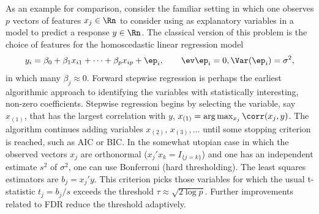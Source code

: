 \documentclass[12pt]{article}
\begin{document}
 As an example for comparison, consider the familiar setting in which one
 observes $p$ vectors of features $x_j \in \Rn$ to consider using as explanatory
 variables in a model to predict a response $y \in \Rn$.  The classical version
 of this problem is the choice of features for the homoscedastic linear
 regression model
 \begin{equation}
   y_i = \beta_0 + \beta_1 x_{i1} + \cdots + \beta_p x_{ip} + \ep_i, 
     \qquad \ev \ep_i = 0, \Var(\ep_i)=\sigma^2,
 \label{eq:homo}
 \end{equation}
 in which many $\beta_j \approx 0$.  Forward stepwise regression is perhaps the
 earliest algorithmic approach to identifying the variables with statistically
 interesting, non-zero coefficients.  Stepwise regression begins by selecting
 the variable, say $x_{(1)}$, that has the largest correlation with $y$,
 $x_{(1)} = \arg \max_{x_j} \corr(x_j,y)$.  The algorithm continues adding
 variables $x_{(2)},\, x_{(3)}, \ldots$ until some stopping criterion is
 reached, such as AIC or BIC.  In the somewhat utopian case in which the
 observed vectors $x_j$ are orthonormal ($x_j'x_k = I_{\{j=k\}}$) and one has an
 independent estimate $s^2$ of $\sigma^2$, one can use Bonferroni (hard
 thresholding).  The least squares estimators are $b_j = x_j'y.$ This criterion
 picks those variables for which the usual t-statistic $t_j = b_j/s$ exceeds the
 threshold $\tau \approx \sqrt{2 \log p}$.  Further improvements related
 to FDR reduce the threshold adaptively.
\end{document}
